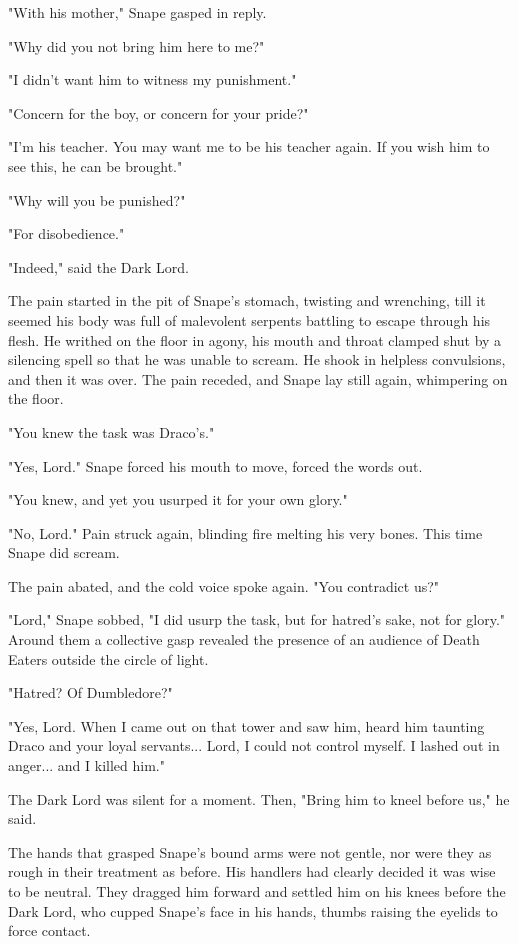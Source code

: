 \documentclass[a4paper,11pt]{article}
\begin{document}
"With his mother," Snape gasped in reply.

"Why did you not bring him here to me?"

"I didn't want him to witness my punishment."

"Concern for the boy, or concern for your pride?"

"I'm his teacher. You may want me to be his teacher again. If you wish him to see this, he can be brought."

"Why will you be punished?"

"For disobedience."

"Indeed," said the Dark Lord.

The pain started in the pit of Snape's stomach, twisting and wrenching, till it seemed his body was full of malevolent serpents battling to escape through his flesh. He writhed on the floor in agony, his mouth and throat clamped shut by a silencing spell so that he was unable to scream. He shook in helpless convulsions, and then it was over. The pain receded, and Snape lay still again, whimpering on the floor.

"You knew the task was Draco's."

"Yes, Lord." Snape forced his mouth to move, forced the words out.

"You knew, and yet you usurped it for your own glory."

"No, Lord." Pain struck again, blinding fire melting his very bones. This time Snape did scream.

The pain abated, and the cold voice spoke again. "You contradict us?"

"Lord," Snape sobbed, "I did usurp the task, but for hatred's sake, not for glory." Around them a collective gasp revealed the presence of an audience of Death Eaters outside the circle of light.

"Hatred? Of Dumbledore?"

"Yes, Lord. When I came out on that tower and saw him, heard him taunting Draco and your loyal servants... Lord, I could not control myself. I lashed out in anger... and I killed him."

The Dark Lord was silent for a moment. Then, "Bring him to kneel before us," he said.

The hands that grasped Snape's bound arms were not gentle, nor were they as rough in their treatment as before. His handlers had clearly decided it was wise to be neutral. They dragged him forward and settled him on his knees before the Dark Lord, who cupped Snape's face in his hands, thumbs raising the eyelids to force contact.
\end{document}
